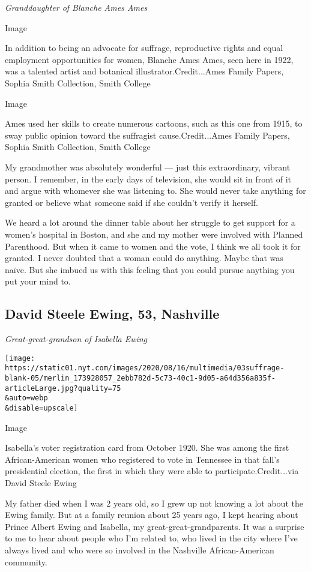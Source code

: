\emph{Granddaughter of Blanche Ames Ames}

Image

In addition to being an advocate for suffrage, reproductive rights and
equal employment opportunities for women, Blanche Ames Ames, seen here
in 1922, was a talented artist and botanical illustrator.Credit...Ames
Family Papers, Sophia Smith Collection, Smith College

Image

Ames used her skills to create numerous cartoons, such as this one from
1915, to sway public opinion toward the suffragist cause.Credit...Ames
Family Papers, Sophia Smith Collection, Smith College

My grandmother was absolutely wonderful --- just this extraordinary,
vibrant person. I remember, in the early days of television, she would
sit in front of it and argue with whomever she was listening to. She
would never take anything for granted or believe what someone said if
she couldn't verify it herself.

We heard a lot around the dinner table about her struggle to get support
for a women's hospital in Boston, and she and my mother were involved
with Planned Parenthood. But when it came to women and the vote, I think
we all took it for granted. I never doubted that a woman could do
anything. Maybe that was naïve. But she imbued us with this feeling that
you could pursue anything you put your mind to.

\hypertarget{david-steele-ewing-53-nashville}{%
\subsection{David Steele Ewing, 53,
Nashville}\label{david-steele-ewing-53-nashville}}

\emph{Great-great-grandson of Isabella Ewing}

\texttt{[image: https://static01.nyt.com/images/2020/08/16/multimedia/03suffrage-blank-05/merlin\_173928057\_2ebb782d-5c73-40c1-9d05-a64d356a835f-articleLarge.jpg?quality=75\\\&auto=webp\\\&disable=upscale]}

Image

Isabella's voter registration card from October 1920. She was among the
first African-American women who registered to vote in Tennessee in that
fall's presidential election, the first in which they were able to
participate.Credit...via David Steele Ewing

My father died when I was 2 years old, so I grew up not knowing a lot
about the Ewing family. But at a family reunion about 25 years ago, I
kept hearing about Prince Albert Ewing and Isabella, my
great-great-grandparents. It was a surprise to me to hear about people
who I'm related to, who lived in the city where I've always lived and
who were so involved in the Nashville African-American community.

